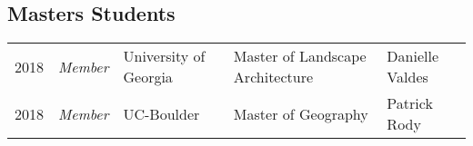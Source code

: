 \subsection{Masters Students}
\begin{tabularx}{\linewidth}{llXXX}
2018 & \textit{Member} & University of Georgia & Master of Landscape Architecture & Danielle Valdes\\
2018 & \textit{Member} & UC-Boulder & Master of Geography & Patrick Rody\\
\end{tabularx}